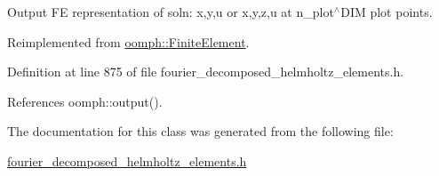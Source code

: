 Output FE representation of soln\+: x,y,u or x,y,z,u at n\+\_\+plot$^\wedge$\+D\+IM plot points. 



Reimplemented from \hyperlink{classoomph_1_1FiniteElement_afa9d9b2670f999b43e6679c9dd28c457}{oomph\+::\+Finite\+Element}.



Definition at line 875 of file fourier\+\_\+decomposed\+\_\+helmholtz\+\_\+elements.\+h.



References oomph\+::output().



The documentation for this class was generated from the following file\+:\begin{DoxyCompactItemize}
\item 
\hyperlink{fourier__decomposed__helmholtz__elements_8h}{fourier\+\_\+decomposed\+\_\+helmholtz\+\_\+elements.\+h}\end{DoxyCompactItemize}

